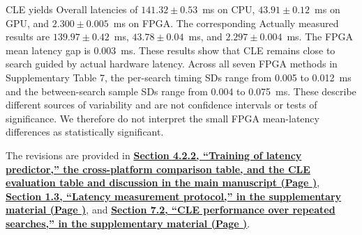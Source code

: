 \documentclass[11pt]{article}
\newcommand{\finishresponse}{\par\color{black}\vspace{5mm}}
\newcommand{\revloc}[1]{%
  \textcolor{revisionred}{\textbf{\uline{#1}}}}
\begin{document}
\begin{enumerate}[leftmargin=0pt,label={},itemsep=5mm]
CLE yields Overall latencies of $141.32\pm0.53$~ms on CPU, $43.91\pm0.12$~ms on GPU, and $2.300\pm0.005$~ms on FPGA. The corresponding Actually measured results are $139.97\pm0.42$~ms, $43.78\pm0.04$~ms, and $2.297\pm0.004$~ms. The FPGA mean latency gap is 0.003~ms. These results show that CLE remains close to search guided by actual hardware latency. Across all seven FPGA methods in Supplementary Table 7, the per-search timing SDs range from 0.005 to 0.012~ms and the between-search sample SDs range from 0.004 to 0.075~ms. These describe different sources of variability and are not confidence intervals or tests of significance. We therefore do not interpret the small FPGA mean-latency differences as statistically significant.

The revisions are provided in \revloc{Section 4.2.2, ``Training of latency predictor,'' the cross-platform comparison table, and the CLE evaluation table and discussion in the main manuscript (Page \underline{\hspace{1cm}})}, \revloc{Section 1.3, ``Latency measurement protocol,'' in the supplementary material (Page \underline{\hspace{1cm}})}, and \revloc{Section 7.2, ``CLE performance over repeated searches,'' in the supplementary material (Page \underline{\hspace{1cm}})}.

\par\endgroup
\finishresponse


\end{enumerate}
\end{document}
